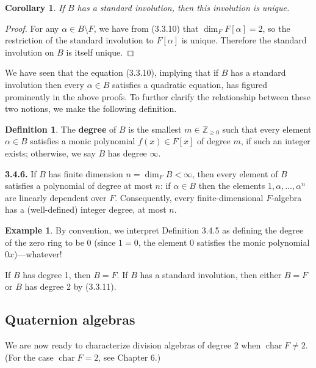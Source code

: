 \documentclass{article}
\newtheorem{corollary}[theorem]{Corollary}
\theoremstyle{definition}
\newtheorem{definition}[theorem]{Definition}
\newtheorem{example}[theorem]{Example}
\begin{document}
\begin{corollary}
If $B$ has a standard involution, then this involution is unique.
\end{corollary}

\begin{proof}
For any $\alpha \in B \setminus F$, we have from (3.3.10) that $\dim_F F[\alpha] = 2$, so the restriction of the standard involution to $F[\alpha]$ is unique. Therefore the standard involution on $B$ is itself unique.
\end{proof}

We have seen that the equation (3.3.10), implying that if $B$ has a standard involution then every $\alpha \in B$ satisfies a quadratic equation, has figured prominently in the above proofs. To further clarify the relationship between these two notions, we make the following definition.

\begin{definition}
The \textbf{degree} of $B$ is the smallest $m \in \mathbb{Z}_{\geq 0}$ such that every element $\alpha \in B$ satisfies a monic polynomial $f(x) \in F[x]$ of degree $m$, if such an integer exists; otherwise, we say $B$ has degree $\infty$.
\end{definition}

\textbf{3.4.6.} If $B$ has finite dimension $n = \dim_F B < \infty$, then every element of $B$ satisfies a polynomial of degree at most $n$: if $\alpha \in B$ then the elements $1, \alpha, \dots, \alpha^n$ are linearly dependent over $F$. Consequently, every finite-dimensional $F$-algebra has a (well-defined) integer degree, at most $n$.

\begin{example}
By convention, we interpret Definition 3.4.5 as defining the degree of the zero ring to be 0 (since $1 = 0$, the element 0 satisfies the monic polynomial $0x$)---whatever!

If $B$ has degree 1, then $B = F$. If $B$ has a standard involution, then either $B = F$ or $B$ has degree 2 by (3.3.11).
\end{example}

\subsection{Quaternion algebras}

We are now ready to characterize division algebras of degree 2 when $\operatorname{char} F \neq 2$. (For the case $\operatorname{char} F = 2$, see Chapter 6.)
\end{document}
